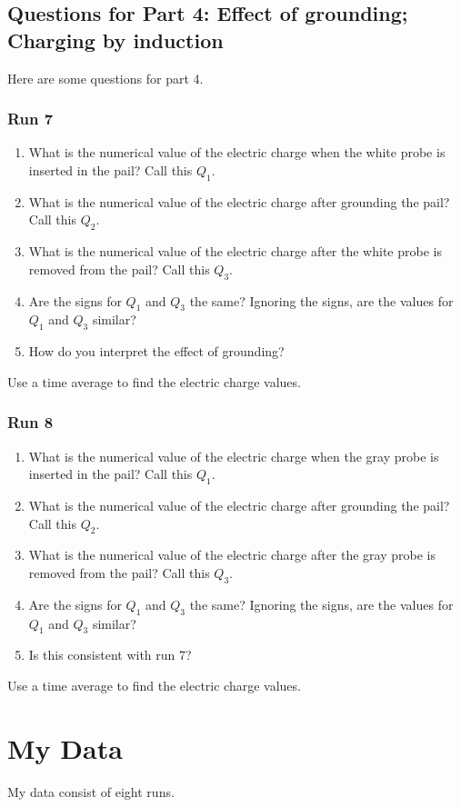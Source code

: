 \subsection{Questions for Part 4: Effect of grounding; Charging by induction}
%
Here are some questions for part 4.
%
\subsubsection{Run 7}
%
\begin{enumerate}
	\item What is the numerical value of the electric charge when the white probe is inserted in the pail? Call this $Q_{1}$.
	\item What is the numerical value of the electric charge after grounding the pail? Call this $Q_{2}$.
	\item What is the numerical value of the electric charge after the white probe is removed from the pail? Call this $Q_{3}$.
	\item Are the signs for $Q_{1}$ and $Q_{3}$ the same? Ignoring the signs, are the values for $Q_{1}$ and $Q_{3}$ similar?
	\item How do you interpret the effect of grounding?
\end{enumerate}
Use a time average to find the electric charge values.
%
\subsubsection{Run 8}
%
\begin{enumerate}
	\item What is the numerical value of the electric charge when the gray probe is inserted in the pail? Call this $Q_{1}$.
	\item What is the numerical value of the electric charge after grounding the pail? Call this $Q_{2}$.
	\item What is the numerical value of the electric charge after the gray probe is removed from the pail? Call this $Q_{3}$.
	\item Are the signs for $Q_{1}$ and $Q_{3}$ the same? Ignoring the signs, are the values for $Q_{1}$ and $Q_{3}$ similar?
	\item Is this consistent with run 7?
\end{enumerate}
Use a time average to find the electric charge values.
%
\section{My Data}
%
My data consist of eight runs.
%
